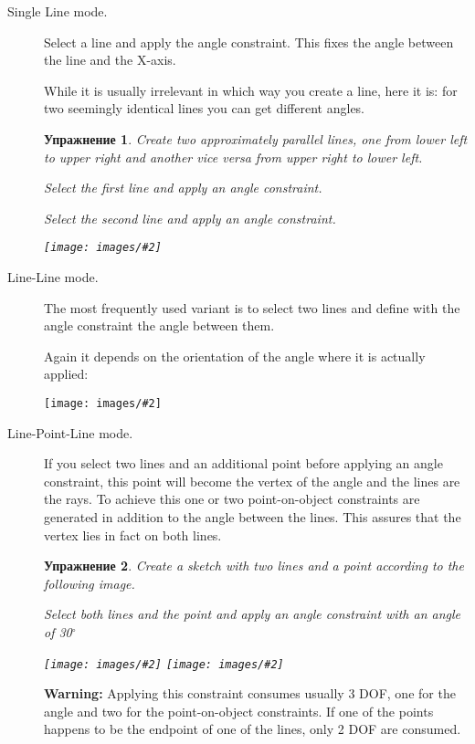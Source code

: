 \documentclass[12pt,titlepage]{article}
\newcommand{\degree}{\ensuremath{^\circ}}
\newcommand{\icon}[1]{\raisebox{-1em}{\rule{0pt}{27pt}\texttt{[image: images/\#1]}}}
\newcommand{\img}[2]{\vspace{2ex}\noindent\texttt{[image: images/\#2]}}
\newtheorem{Exercise}{Упражнение}
\begin{document}
\begin{description}
\item [Single Line mode.] Select a line and apply the angle constraint. This
      fixes the angle between the line and the X-axis.
      
      While it is usually irrelevant in which way you create a line, here it
      is: for two seemingly identical lines you can get different angles.

\begin{Exercise}
Create two approximately parallel lines, one from lower left to upper right
and another vice versa from upper right to lower left.

Select the first line and apply an angle constraint.

Select the second line and apply an angle constraint.

\img{}{AngleXAxis}
\end{Exercise}
      
\item [Line-Line mode.] The most frequently used variant is to select two lines
      and define with the angle constraint the angle between them.
      
      Again it depends on the orientation of the angle where it is actually
      applied:

\img{}{AngleLineLine}

\item [Line-Point-Line mode.]
      If you select two lines and an additional point before applying an
      angle constraint, this point will become the vertex of the angle and the
      lines are the rays. To achieve this one or two point-on-object constraints are
      generated in addition to the angle between the lines. This assures that the
      vertex lies in fact on both lines.
\begin{Exercise}
Create a sketch with two lines and a point according to the following image.


Select both lines and the point and apply an angle constraint with an angle of
30\degree

\img{}{AngleLinePointLine1}
\hspace{2em}
\raisebox{1cm}{$\stackrel{\icon{Constraint_InternalAngle}}{\longrightarrow}$}
\hspace{2em}
\img{}{AngleLinePointLine2}
\end{Exercise}

{\bf Warning:} Applying this constraint consumes usually 3 DOF, one for the
angle and two for the point-on-object constraints. If one of the points
happens to be the endpoint of one of the lines, only 2 DOF are consumed.


\end{description}
\end{document}
